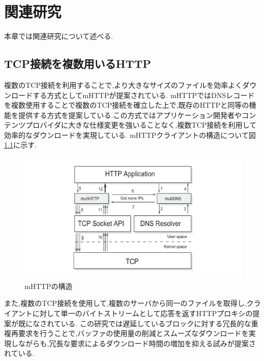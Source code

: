 \documentclass[a4j,12pt]{gradthesis_utf8}
\begin{document}
\chapter{関連研究}\label{sec:sec2}
本章では関連研究について述べる.

\section{TCP接続を複数用いるHTTP}
複数のTCP接続を利用することで,より大きなサイズのファイルを効率よくダウンロードする方式としてmHTTP\cite{mhttp}が提案されている.
mHTTPではDNSレコードを複数使用することで複数のTCP接続を確立した上で,既存のHTTPと同等の機能を提供する方式を提案している.この方式ではアプリケーション開発者やコンテンツプロバイダに大きな仕様変更を強いることなく,複数TCP接続を利用して効率的なダウンロードを実現している.
mHTTPクライアントの構造について図\ref{mhttp}に示す.

\begin{figure}[ht]
	\centering
	\includegraphics[width=16cm]{figure/mhttp.pdf}
	\caption{mHTTPの構造}
	\label{mhttp}
\end{figure}

\newpage

また,複数のTCP接続を使用して,複数のサーバから同一のファイルを取得し,クライアントに対して単一のバイトストリームとして応答を返すHTTPプロキシの提案が既になされている.\cite{proxy}
この研究では遅延しているブロックに対する冗長的な重複再要求を行うことで,バッファの使用量の削減とスムーズなダウンロードを実現しながらも,冗長な要求によるダウンロード時間の増加を抑える試みが提案されている.
\end{document}

